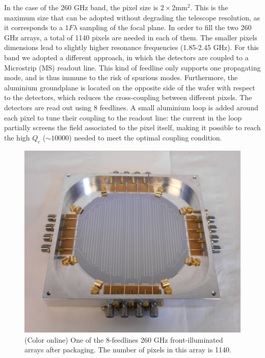 \documentclass[]{aa} %
\begin{document}
In the case of the 260 GHz band, the pixel size is $2\times 2\mathrm{mm}^2$. This is the maximum size that can be adopted without degrading the telescope resolution, as it corresponds to a $1 F \lambda$ sampling of the focal plane. In order to fill the two 260 GHz arrays, a total of 1140 pixels are needed in each of them. The smaller pixels dimensions lead to slightly higher resonance frequencies (1.85-2.45 GHz). For this band we adopted a different approach, in which the detectors are coupled to a Microstrip (MS) readout line. This kind of feedline only supports one propagating mode, and is thus immune to the risk of spurious modes. Furthermore, the aluminium groundplane is located on the opposite side of the wafer with respect to the detectors, which reduces the cross-coupling between different pixels. The detectors are read out using 8 feedlines. A small aluminium loop is added around each pixel to tune their coupling to the readout line: the current in the loop partially screens the field associated to the pixel itself, making it possible to reach the high $Q_c$ ($\sim10000$) needed to meet the optimal coupling condition.

\begin{figure}[h]
   \centering
    \includegraphics[width=.95\linewidth]{1mm_array.jpg}
      \caption{(Color online) One of the 8-feedlines 260 GHz front-illuminated arrays after packaging. The number of pixels in this array is 1140.}
         \label{Array}
\end{figure}
\end{document}
